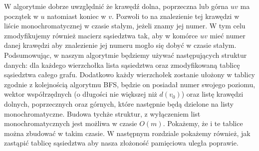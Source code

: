 \documentclass[12pt,a4paper,titlepage]{article}
\begin{document}
W algorytmie dobrze uwzględnić że krawędź dolna, poprzeczna lub górna $uv$ ma początek w $u$ natomiast koniec w $v$. Pozwoli to na znalezienie tej krawędzi w liście monochromatycznej w czasie stałym, jeżeli znamy jej numer. W tym celu zmodyfikujemy również macierz sąsiedztwa tak, aby w komórce $uv$ mieć numer danej krawędzi aby znalezienie jej numeru mogło się dobyć w czasie stałym. \\
Podsumowując, w naszym algorytmie będziemy używać następujących struktur danych: dla każdego wierzchołka lista sąsiedztwa oraz zmodyfikowaną tablicę sąsiedztwa całego grafu. Dodatkowo każdy wierzchołek zostanie ułożony w tablicy zgodnie z kolejnością algorytmu BFS, będzie on posiadał numer swojego poziomu, wektor współrzędnych (o długości nie większej niż $d(v_0)$) oraz listę krawędzi dolnych, poprzecznych oraz górnych, które następnie będą dzielone na listy monochromatyczne. Budowa tychże struktur, z wyłączeniem list monochromatycznych jest możliwa w czasie $O(m)$. Pokażemy, że i te tablice można zbudować w takim czasie. W następnym rozdziale pokażemy również, jak zastąpić tablicę sąsiedztwa aby nasza złożoność pamięciowa uległa poprawie. \\
\\
\end{document}
